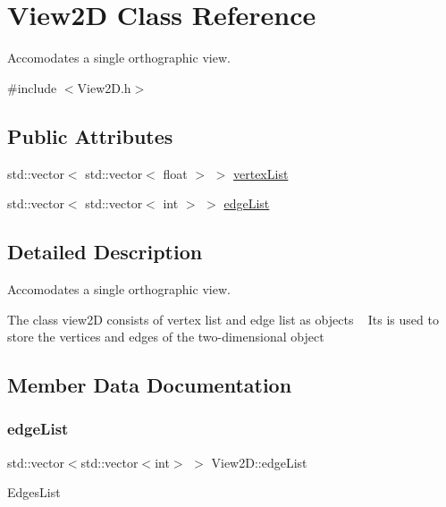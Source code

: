 \hypertarget{class_view2_d}{}\section{View2D Class Reference}
\label{class_view2_d}


Accomodates a single orthographic view.  




{\ttfamily \#include $<$View2\+D.\+h$>$}

\subsection*{Public Attributes}
\begin{DoxyCompactItemize}
\item 
std\+::vector$<$ std\+::vector$<$ float $>$ $>$ \mbox{\hyperlink{class_view2_d_afb60b6b635a9f26142936827cd1e3c01}{vertex\+List}}
\item 
std\+::vector$<$ std\+::vector$<$ int $>$ $>$ \mbox{\hyperlink{class_view2_d_a32589c1489261f198fe5250c8d8257c4}{edge\+List}}
\end{DoxyCompactItemize}


\subsection{Detailed Description}
Accomodates a single orthographic view. 

The class view2D consists of vertex list and edge list as objects ~\newline
Its is used to store the vertices and edges of the two-\/dimensional object 

\subsection{Member Data Documentation}
\mbox{\label{class_view2_d_a32589c1489261f198fe5250c8d8257c4}} 
\subsubsection{\texorpdfstring{edge\+List}{edgeList}}
{\footnotesize\ttfamily std\+::vector$<$std\+::vector$<$int$>$ $>$ View2\+D\+::edge\+List}

Edges\+List \mbox{\label{class_view2_d_afb60b6b635a9f26142936827cd1e3c01}} 
